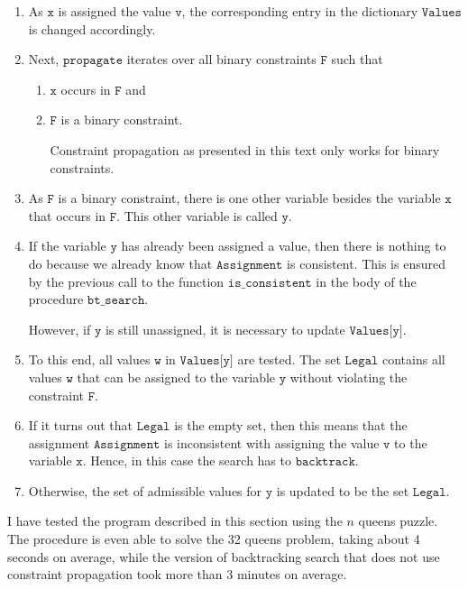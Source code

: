 \begin{enumerate}
\item As $\texttt{x}$ is assigned the value $\texttt{v}$, the corresponding entry in the dictionary
      $\texttt{Values}$ is changed accordingly. 
\item Next, $\texttt{propagate}$ iterates over all binary constraints $\texttt{F}$ such that
      \begin{enumerate}
      \item $\texttt{x}$ occurs in $\texttt{F}$ and
      \item $\texttt{F}$ is a binary constraint.

            Constraint propagation as presented in this text only works for binary constraints.
      \end{enumerate}
\item As $\texttt{F}$ is a binary constraint, there is one other variable besides the variable $\texttt{x}$
      that occurs in $\texttt{F}$.  This other variable is called $\texttt{y}$.  
\item If the variable $\texttt{y}$ has already been assigned a value, then there is nothing to do because
      we already know that $\texttt{Assignment}$ is consistent.  This is ensured by the
      previous call to the function $\texttt{is\_consistent}$ in the body of the procedure $\texttt{bt\_search}$.

      However, if $\texttt{y}$ is still unassigned, it is necessary to update $\texttt{Values[y]}$.
\item To this end, all values $\texttt{w}$ in $\texttt{Values[y]}$ are tested.  
      The set $\texttt{Legal}$ contains all values $\texttt{w}$ that can be assigned to the variable $\texttt{y}$
      without violating the constraint $\texttt{F}$.
\item If it turns out that $\texttt{Legal}$ is the empty set, then this means that the 
      assignment $\texttt{Assignment}$ is inconsistent with assigning the value $\texttt{v}$ to the variable
      $\texttt{x}$.  Hence, in this case the  search has to  $\texttt{backtrack}$.
\item Otherwise, the set of admissible values for $\texttt{y}$ is updated to be the set $\texttt{Legal}$.
\end{enumerate}
I have tested the program described in this section using the $n$ queens puzzle. 
The procedure is even able to solve the 32 queens problem, taking about 4 seconds on average, while the version
of backtracking search that does not use constraint propagation took more than 3 minutes on average.

